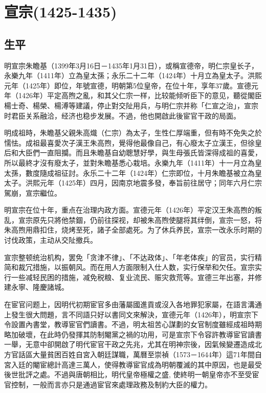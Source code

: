 
\section{宣宗\tiny(1425-1435)}

\subsection{生平}

明宣宗朱瞻基（1399年3月16日－1435年1月31日），或稱宣德帝，明仁宗皇长子，永樂九年（1411年）立為皇太孫；永乐二十二年（1424年）十月立為皇太子。洪熙元年（1425年）即位，年號宣德，明朝第5位皇帝，在位十年，享年37歲。宣德元年（1426年）平定高煦之亂，和其父仁宗一样，比较能倾听臣下的意见，聽從閣臣楊士奇、楊榮、楊溥等建議，停止對交阯用兵，与明仁宗并称「仁宣之治」，宣宗时君臣关系融洽，经济也稳步发展。不過，他也開啟此後宦官干政的局面。

明成祖時，朱瞻基父親朱高熾（仁宗）為太子，生性仁厚端重，但有時不免失之於懦怯。成祖最喜愛次子漢王朱高煦，覺得他最像自己，有心廢太子立漢王，但徐皇后和大臣們一直阻攔。而且朱瞻基自幼聰慧好學，與生母張氏皆深得成祖的喜愛，所以最終才沒有廢太子，並對朱瞻基悉心栽培。永樂九年（1411年）十一月立為皇太孫，數度隨成祖征討。永乐二十二年（1424年）仁宗即位，十月朱瞻基被立為皇太子。洪熙元年（1425年）四月，因南京地震多發，奉旨前往居守；同年六月仁宗駕崩，宣宗繼位。

明宣宗在位十年，重点在治理内政方面。宣德元年（1426年）平定汉王朱高煦的叛乱，宣宗原先只將他禁錮，仍前往探视，却被朱高煦使腿将其绊倒，宣宗一怒，将朱高煦用鼎扣住，烧烤至死，諸子全部處死。为了休兵养民，宣宗一改永乐时期的讨伐政策，主动从交阯撤兵。

宣宗整顿统治机构，罢免「贪津不律」、「不达政体」、「年老体疾」的官员，实行精简和裁冗措施，以振朝风。而在用人方面限制入仕人数，实行保举和欠任。宣宗实行一些减轻民困的措施，减免税粮、复业流民、赈灾救荒等。宣德三年出塞，并修建永寧、隆慶諸城。

在宦官问题上，因明代初期宦官多由藩屬國進貢或沒入各地罪犯家屬，在語言溝通上發生很大問題，言不同語只好以書同文來解決，宣德元年（1426年），明宣宗下令設置內書堂，教導宦官們讀書。不過，明太祖苦心謀劃的女官制度雖經成祖時期略加破壞，在此時仍發揮其防制閹黨之禍的功用，可是宣宗下令容許教導宦官讀書一舉，无意中卻開啟了明代宦官干政之先兆，尤其在明神宗後，因氣候變遷造成北方官話區大量貧困百姓自宮入朝廷謀職，萬曆至崇禎（1573－1644年）這71年間自宮入廷的閹宦總計高達三萬人，使得教導宦官成為明朝覆滅的其中原因，也是最受後世批評之處。不過與唐朝相比，明代皇帝極權之盛, 使終明一朝皇帝亦不至受宦官控制，一般而言亦只是通過宦官來處理政務及制約大臣的權力。

